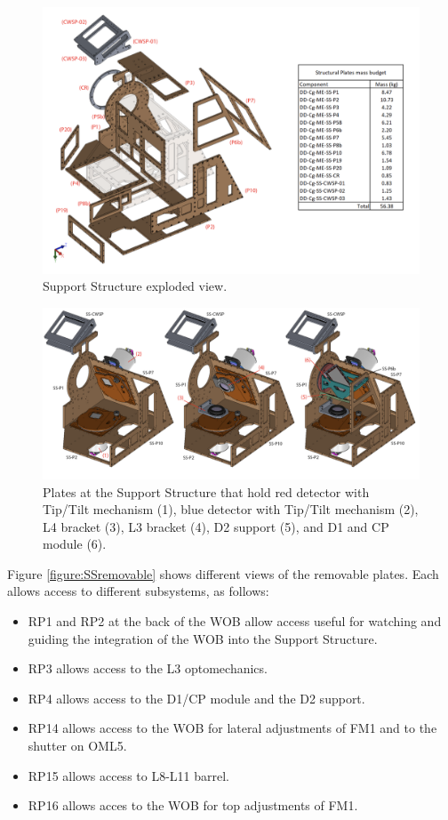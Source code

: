 \documentclass{report}
\begin{document}
\clearpage

\begin{figure}
\centering
\includegraphics[width=1\linewidth]{figures/SSexploded.png}
\caption{Support Structure exploded view.}
\label{figure:SSexploded}
\end{figure}

\begin{figure}
\centering
\includegraphics[width=1\linewidth]{figures/SSholds.png}
\caption{Plates at the Support Structure that hold red detector with Tip/Tilt mechanism (1), blue detector with Tip/Tilt mechanism (2), L4 bracket (3), L3 bracket (4), D2 support (5), and D1 and CP module (6).
}
\label{figure:SSholds}
\end{figure}

Figure \ref{figure:SSremovable} shows different views of the removable plates. Each allows access to different subsystems, as follows:
\begin{itemize}
\item RP1 and RP2 at the back of the WOB allow access useful for watching and guiding the integration of the WOB into the Support Structure.
\item RP3 allows access to the L3 optomechanics.
\item RP4 allows access to the D1/CP module and the D2 support.
\item RP14 allows access to the WOB for lateral adjustments of FM1 and to the shutter on OML5.
\item RP15 allows access to L8-L11 barrel.
\item RP16 allows acces to the WOB for top adjustments of FM1.
\end{itemize}
\end{document}
